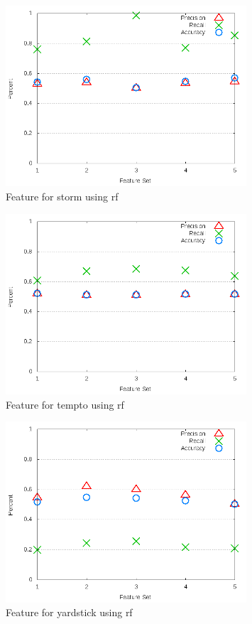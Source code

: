 \begin{figure}[!t]
\centering
\includegraphics[width=0.8\textwidth]{images/rf/test_3/storm_sample_range.png}
\caption{Feature for storm using \gls{rf}}
\label{fig:test_3_storm_rf}
\end{figure}

\clearpage
\begin{figure}[!t]
\centering
\includegraphics[width=0.8\textwidth]{images/rf/test_3/tempto_sample_range.png}
\caption{Feature for tempto using \gls{rf}}
\label{fig:test_3_tempto_rf}
\end{figure}

\begin{figure}[!t]
\centering
\includegraphics[width=0.8\textwidth]{images/rf/test_3/yardstick_sample_range.png}
\caption{Feature for yardstick using \gls{rf}}
\label{fig:test_3_yardstick_rf}
\end{figure}
